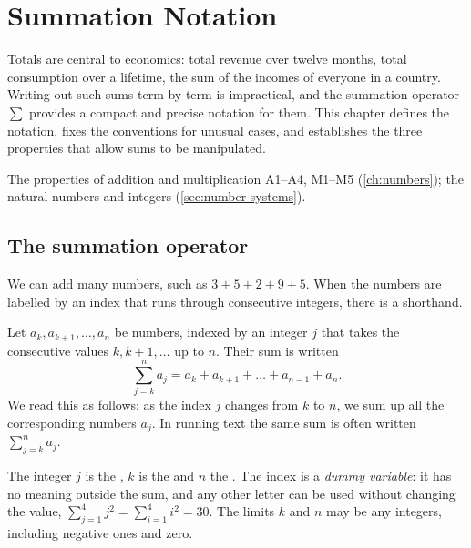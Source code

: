 \chapter{Summation Notation}\label{ch:sum}

\begin{chapterintro}
Totals are central to economics: total revenue over twelve months, total consumption over a lifetime, the sum
of the incomes of everyone in a country. Writing out such sums term by term is impractical, and the summation
operator $\sum$ provides a compact and precise notation for them. This chapter defines the notation, fixes the
conventions for unusual cases, and establishes the three properties that allow sums to be manipulated.
\end{chapterintro}

\begin{prerequisites}
The properties of addition and multiplication A1--A4, M1--M5 (\cref{ch:numbers}); the natural numbers and integers
(\cref{sec:number-systems}).
\end{prerequisites}

\section{The summation operator}\label{sec:sigma}

We can add many numbers, such as $3+5+2+9+5$. When the numbers are labelled by an index that runs through
consecutive integers, there is a shorthand.

\begin{definition}
Let $a_k,a_{k+1},\dots,a_n$ be numbers, indexed by an integer $j$ that takes the consecutive values
$k,k+1,\dots$ up to $n$. Their sum is written
\[
\sum_{j=k}^{n}a_j=a_k+a_{k+1}+\dots+a_{n-1}+a_n.
\]
We read this as follows: as the index $j$ changes from $k$ to $n$, we sum up all the corresponding numbers $a_j$.
In running text the same sum is often written $\sum_{j=k}^n a_j$. 
\end{definition}

The integer $j$ is the , $k$ is the  and $n$ the .
The index is a \emph{dummy variable}: it has no meaning outside the sum, and any other letter can be used without
changing the value, $\sum_{j=1}^4 j^2=\sum_{i=1}^4 i^2=30$. The limits $k$ and $n$ may be any integers, including
negative ones and zero.

